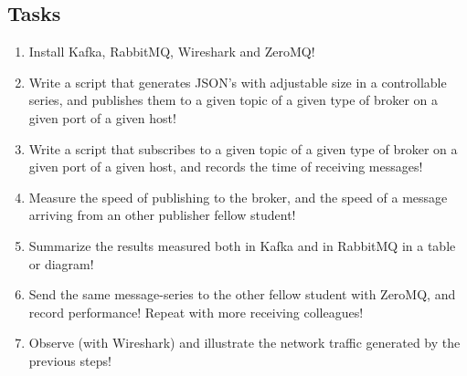 \documentclass[a4paper]{article}
\begin{document}
\subsection{Tasks}

\begin{enumerate}
\item Install Kafka, RabbitMQ, Wireshark and ZeroMQ!
\item Write a script that generates JSON's with adjustable size in a controllable series, and publishes them to a given topic of a given type of broker on a given port of a given host!
\item Write a script that subscribes to a given topic of a given type of broker on a given port of a given host, and records the time of receiving messages!
\item Measure the speed of publishing to the broker, and the speed of a message arriving from an other publisher fellow student!
\item Summarize the results measured both in Kafka and in RabbitMQ in a table or diagram!
\item Send the same message-series to the other fellow student with ZeroMQ, and record performance! Repeat with more receiving colleagues!
\item Observe (with Wireshark) and illustrate the network traffic generated by the previous steps!
\end{enumerate}
\end{document}
